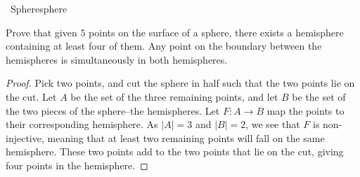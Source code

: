     \begin{example}{\Difficulty\,\Difficulty\,\,Sphere}{sphere}
    
        Prove that given \(5\) points on the surface of a sphere, there exists a hemisphere containing at least four of them. Any point on the boundary between the hemispheres is simultaneously in both hemispheres.
        \begin{proof}
            Pick two points, and cut the sphere in half such that the two points lie on the cut. Let \(A\) be the set of the three remaining points, and let \(B\) be the set of the two pieces of the sphere--the hemispheres. Let \(F:A\to B\) map the points to their corresponding hemisphere. As \(|A|=3\) and \(|B|=2\), we see that \(F\) is non-injective, meaning that at least two remaining points will fall on the same hemisphere. These two points add to the two points that lie on the cut, giving four points in the hemisphere.
        \end{proof}
    
    \end{example}
    \pagebreak
